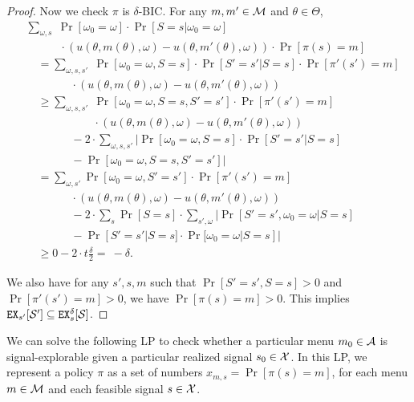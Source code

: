 \begin{proof}
Now we check $\pi$ is $\delta$-BIC. For any $m,m' \in \mathcal{M}$ and $\theta \in \varTheta$,
\begin{align*}
& \textstyle \sum_{\omega,s}\; 
    \Pr[\omega_0= \omega] \cdot \Pr[S = s | \omega_0 = \omega] \\
&\quad\qquad \cdot \left(u(\theta, m(\theta), \omega) - u(\theta, m'(\theta), \omega)\right)
\cdot  \Pr[\pi(s) = m] \\
&\quad= 
    \textstyle \sum_{\omega,s,s'}\; 
        \Pr[\omega_0 = \omega, S = s] \cdot \Pr[ S'=s'|S= s] \cdot \Pr[\pi'(s') = m]   \\
&\qquad\qquad\cdot \left(u(\theta, m(\theta), \omega) - u(\theta, m'(\theta), \omega)\right)\\
&\quad\geq \textstyle \sum_{\omega,s,s'}\;
 \Pr[\omega_0 = \omega, S = s, S'=s'] \cdot \Pr[\pi'(s') = m]   \\
&\qquad\qquad\qquad\cdot \left(u(\theta, m(\theta), \omega) - u(\theta, m'(\theta),
 \omega)\right)\\
&\qquad\qquad -2 \cdot \sum_{\omega,s,s'} | \Pr[\omega_0 = \omega, S = s] \cdot \Pr[ S'=s'|S= s]\\
&\qquad\qquad -  \Pr[\omega_0 = \omega, S = s, S'=s']| \\
&\quad= \sum_{\omega,s'} \Pr[\omega_0 = \omega, S'=s'] \cdot \Pr[\pi'(s') = m]  \\
&\qquad\qquad \cdot \left(u(\theta, m(\theta), \omega) - u(\theta, m'(\theta),
 \omega)\right)\\
&\qquad\qquad -2 \cdot \sum_{s} \Pr[S = s] \cdot  \sum_{s', \omega} | \Pr[S' = s', \omega_0 = \omega| S= s] \\
&\qquad\qquad- \Pr[S'=s'|S=s] \cdot \Pr[\omega_0 = \omega|S=s]| \\
&\quad\geq  0- 2 \cdot t\tfrac{\delta}{2} = ~-\delta.
\end{align*}

We also have for any $s', s ,m$ such that $\Pr[S' = s',S = s] >0 $ and $\Pr[\pi'(s') = m] >0$, we have $\Pr[\pi(s) = m] > 0$. This implies $\mathtt{EX}_{s'}[\mathcal{S}'] \subseteq \mathtt{EX}^{\delta}_s[\mathcal{S}]$.
\end{proof}


We can solve the following LP to check whether a particular menu $m_0 \in\mathcal{A}$ is signal-explorable given a particular realized signal $s_0\in\mathcal{X}$. In this LP, we represent a policy $\pi$ as a set of numbers
    $x_{m,s} = \Pr[\pi(s)=m]$,
for each menu $m\in \mathcal{M}$ and each feasible signal $s\in \mathcal{X}$.

